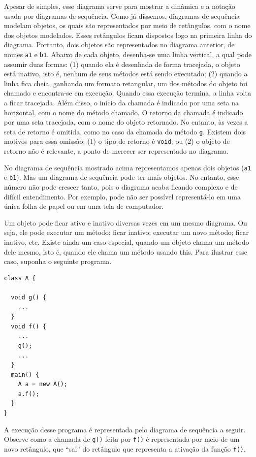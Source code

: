 \documentclass[
  11pt,
  twoside]{book}
\newcommand{\passthrough}[1]{#1}
\begin{document}
Apesar de simples, esse diagrama serve para mostrar a dinâmica e a
notação usada por diagramas de sequência. Como já dissemos, diagramas de
sequência modelam objetos, os quais são representados por meio de
retângulos, com o nome dos objetos modelados. Esses retângulos ficam
dispostos logo na primeira linha do diagrama. Portanto, dois objetos são
representados no diagrama anterior, de nomes
\passthrough{\lstinline!a1!} e \passthrough{\lstinline!b1!}. Abaixo de
cada objeto, desenha-se uma linha vertical, a qual pode assumir duas
formas: (1) quando ela é desenhada de forma tracejada, o objeto está
inativo, isto é, nenhum de seus métodos está sendo executado; (2) quando
a linha fica cheia, ganhando um formato retangular, um dos métodos do
objeto foi chamado e encontra-se em execução. Quando essa execução
termina, a linha volta a ficar tracejada. Além disso, o início da
chamada é indicado por uma seta na horizontal, com o nome do método
chamado. O retorno da chamada é indicado por uma seta tracejada, com o
nome do objeto retornado. No entanto, às vezes a seta de retorno é
omitida, como no caso da chamada do método \passthrough{\lstinline!g!}.
Existem dois motivos para essa omissão: (1) o tipo de retorno é
\passthrough{\lstinline!void!}; ou (2) o objeto de retorno não é
relevante, a ponto de merecer ser representado no diagrama.

No diagrama de sequência mostrado acima representamos apenas dois
objetos (\passthrough{\lstinline!a1!} e \passthrough{\lstinline!b1!}).
Mas um diagrama de sequência pode ter mais objetos. No entanto, esse
número não pode crescer tanto, pois o diagrama acaba ficando complexo e
de difícil entendimento. Por exemplo, pode não ser possível
representá-lo em uma única folha de papel ou em uma tela de computador.

Um objeto pode ficar ativo e inativo diversas vezes em um mesmo
diagrama. Ou seja, ele pode executar um método; ficar inativo; executar
um novo método; ficar inativo, etc. Existe ainda um caso especial,
quando um objeto chama um método dele mesmo, isto é, quando ele chama um
método usando this. Para ilustrar esse caso, suponha o seguinte
programa.

\begin{lstlisting}
class A {

  void g() {
    ...
  }   
  void f() {
    ...
    g();
    ...
  }
  main() {
    A a = new A();
    a.f();
  }
}
\end{lstlisting}

A execução desse programa é representada pelo diagrama de sequência a
seguir. Observe como a chamada de \passthrough{\lstinline!g()!} feita
por \passthrough{\lstinline!f()!} é representada por meio de um novo
retângulo, que ``sai'' do retângulo que representa a ativação da função
\passthrough{\lstinline!f()!}.
\end{document}
